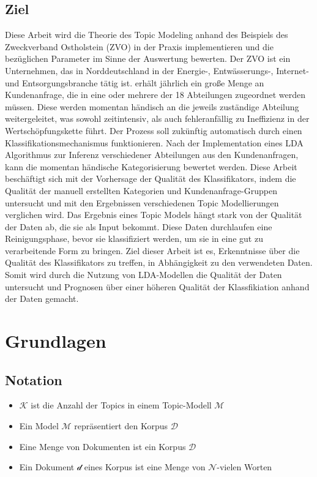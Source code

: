 \documentclass[german,version-2020-11]{uzl-thesis}
\begin{document}
\section{Ziel}
Diese Arbeit wird die Theorie des Topic Modeling anhand des Beispiels des Zweckverband Ostholstein (ZVO) in der Praxis implementieren und die bezüglichen Parameter im Sinne der Auswertung bewerten. Der ZVO ist ein Unternehmen, das in Norddeutschland in der Energie-, Entwässerungs-, Internet- und Entsorgungsbranche tätig ist.  erhält jährlich ein große Menge an Kundenanfrage, die in eine oder mehrere der 18 Abteilungen zugeordnet werden müssen. Diese werden momentan händisch an die jeweils zuständige Abteilung weitergeleitet, was sowohl zeitintensiv, als auch fehleranfällig zu Ineffizienz in der Wertschöpfungskette führt. Der Prozess soll zukünftig automatisch durch einen Klassifikationsmechanismus funktionieren. Nach der Implementation eines LDA Algorithmus zur Inferenz verschiedener Abteilungen aus den Kundenanfragen, kann die momentan händische Kategorisierung bewertet werden. Diese Arbeit beschäftigt sich mit der Vorhersage der Qualität des Klassifikators, indem die Qualität der manuell erstellten Kategorien und Kundenanfrage-Gruppen untersucht und mit den Ergebnissen verschiedenen Topic Modellierungen verglichen wird. Das Ergebnis eines Topic Models hängt stark von der Qualität der Daten ab, die sie als Input bekommt. Diese Daten durchlaufen eine Reinigungsphase, bevor sie klassifiziert werden, um sie in eine gut zu verarbeitende Form zu bringen. Ziel dieser Arbeit ist es, Erkenntnisse über die Qualität des Klassifikators zu treffen, in Abhängigkeit zu den verwendeten Daten. Somit wird durch die Nutzung von LDA-Modellen die Qualität der Daten untersucht und Prognosen über einer höheren Qualität der Klassfikiation anhand der Daten gemacht. 

\chapter{Grundlagen}%


\section{Notation}

\begin{itemize}
	\item $\mathcal{K}$ ist die Anzahl der Topics in einem Topic-Modell $\mathcal{M}$
	\item Ein Model $\mathcal{M}$ repräsentiert den Korpus $\mathcal{D}$
	\item Eine Menge von Dokumenten ist ein Korpus $\mathcal{D}$
	\item Ein Dokument $\mathcal{d}$ eines Korpus ist eine Menge von $\mathcal{N}$-vielen 
	Worten 
\end{itemize}
\end{document}
